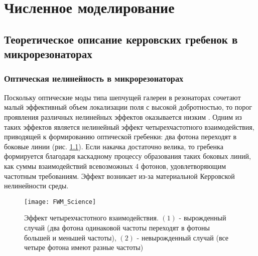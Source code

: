 \chapter{Численное моделирование} \label{chapt2}

\section{Теоретическое описание керровских гребенок в микрорезонаторах}

\subsection{Оптическая нелинейность в микрорезонаторах}
Поскольку оптические моды типа шепчущей галереи в резонаторах сочетают малый эффективный объем локализации поля с высокой добротностью, то порог проявления различных нелинейных эффектов оказывается низким \cite{Gorodetsky}. Одним из таких эффектов является нелинейный эффект четырехчастотного взаимодействия, приводящей к формированию оптической гребенки: два фотона переходят в боковые линии (рис. \ref{cascading}). Если накачка достаточно велика, то гребенка формируется благодаря каскадному процессу образования таких боковых линий, как суммы взаимодействий всевозможных 4 фотонов, удовлетворяющим частотным требованиям. Эффект возникает из-за материальной Керровской нелинейности среды.

\begin{figure}
  \centering
  \texttt{[image: FWM\_Science]}
  \caption{Эффект четырехчастотного взаимодействия. $(1)$ - вырожденный случай (два фотона одинаковой частоты переходят в фотоны большей и меньшей частоты), $(2)$ - невырожденный случай (все четыре фотона имеют разные частоты)} \label{cascading}
\end{figure}


